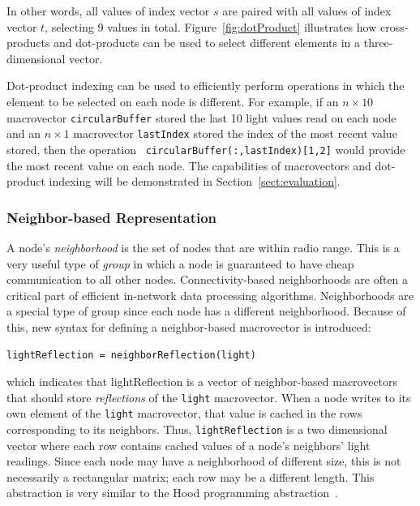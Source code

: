 In other words, all values of index vector $s$ are paired with all values of
index vector $t$, selecting 9 values in total.  Figure~\ref{fig:dotProduct}
illustrates how cross-products and dot-products can be used to select different
elements in a three-dimensional vector.

Dot-product indexing can be used to efficiently perform operations in which the
element to be selected on each node is different.  For example, if an $n \times
10$ macrovector {\tt circularBuffer} stored the last 10 light values read on
each node and an $n \times 1$ macrovector {\tt lastIndex} stored the index of
the most recent value stored, then the operation {\tt
circularBuffer(:,lastIndex)[1,2]} would provide the most recent value on each
node. The capabilities of macrovectors and dot-product indexing will be
demonstrated in Section~\ref{sect:evaluation}.

\subsubsection{Neighbor-based
Representation} \label{sect:neighborRepresentation} A node's {\em neighborhood}
is the set of nodes that are within radio range.  This is a very useful type of
{\em group} in which a node is guaranteed to have cheap communication to all
other nodes. Connectivity-based neighborhoods are often a critical part of
efficient in-network data processing algorithms.  Neighborhoods are a special
type of group since each node has a different neighborhood.  Because of this,
new syntax for defining a neighbor-based macrovector is introduced: 

\vspace{.1in}
\begin{center}
\ttfamily\small
\begin{verbatim}
lightReflection = neighborReflection(light)
\end{verbatim}
\end{center}
\vspace{.1in} 
\noindent which indicates that lightReflection is a vector of neighbor-based
macrovectors that should store {\em reflections} of the {\tt light}
macrovector. When a node writes to its own element of the {\tt light}
macrovector, that value is cached in the rows corresponding to its neighbors.
Thus, {\tt lightReflection} is a two dimensional vector where each row contains
cached values of a node's neighbors' light readings. Since each node may have a
neighborhood of different size, this is not necessarily a rectangular matrix;
each row may be a different length.  This abstraction is very similar to the
Hood programming abstraction~\cite{Whitehousea}.

